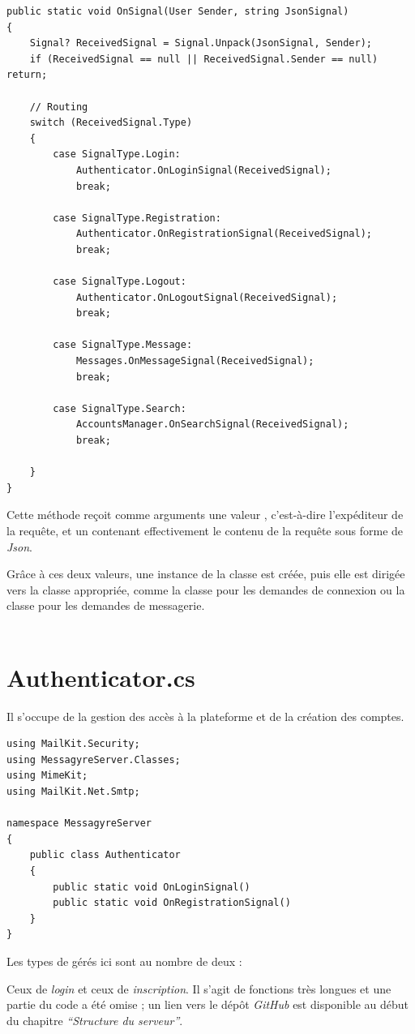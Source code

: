 \documentclass[12pt]{report}
\begin{document}
\begin{verbatim}
public static void OnSignal(User Sender, string JsonSignal)
{
	Signal? ReceivedSignal = Signal.Unpack(JsonSignal, Sender);
	if (ReceivedSignal == null || ReceivedSignal.Sender == null) return;

	// Routing
	switch (ReceivedSignal.Type)
	{
		case SignalType.Login:
			Authenticator.OnLoginSignal(ReceivedSignal);
			break;

		case SignalType.Registration:
			Authenticator.OnRegistrationSignal(ReceivedSignal);
			break;

		case SignalType.Logout:
			Authenticator.OnLogoutSignal(ReceivedSignal);
			break;

		case SignalType.Message:
			Messages.OnMessageSignal(ReceivedSignal);
			break;

		case SignalType.Search:
			AccountsManager.OnSearchSignal(ReceivedSignal);
			break;

	}
}
\end{verbatim}

Cette méthode reçoit comme arguments une valeur , c'est-à-dire l'expéditeur de la requête, et un  contenant effectivement le contenu de la requête sous forme de \textit{Json}.

Grâce à ces deux valeurs, une instance de la classe  est créée, puis elle est dirigée vers la classe appropriée, comme la classe  pour les demandes de connexion ou la classe  pour les demandes de messagerie.
\\\\
\section{Authenticator.cs}

Il s’occupe de la gestion des accès à la plateforme et de la création des comptes.

\begin{verbatim}
using MailKit.Security;
using MessagyreServer.Classes;
using MimeKit;
using MailKit.Net.Smtp;

namespace MessagyreServer
{
	public class Authenticator
	{
		public static void OnLoginSignal()
		public static void OnRegistrationSignal()
	}
}
\end{verbatim}

Les types de  gérés ici sont au nombre de deux : 

Ceux de \textit{login} et ceux de \textit{inscription}. Il s'agit de fonctions très longues et une partie du code a été omise ; un lien vers le dépôt \textit{GitHub} est disponible au début du chapitre \textit{“Structure du serveur”}.
\end{document}
